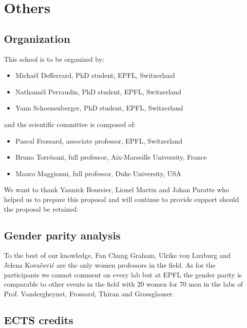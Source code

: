 \documentclass[a4paper]{scrartcl}
\begin{document}
\section{Others}

\subsection{Organization}

This school is to be organized by:
\begin{itemize}
	\setlength{\itemsep}{0pt} \setlength{\parskip}{0pt}
	\item Michaël Defferrard, PhD student, EPFL, Switzerland
	\item Nathanaël Perraudin, PhD student, EPFL, Switzerland
	\item Yann Schoenenberger, PhD student, EPFL, Switzerland
\end{itemize}
and the scientific committee is composed of:
\begin{itemize}
	\setlength{\itemsep}{0pt} \setlength{\parskip}{0pt}
	\item Pascal Frossard, associate professor, EPFL, Switzerland
	\item Bruno Torrésani, full professor, Aix-Marseille University, France
	\item Mauro Maggionni, full professor, Duke University, USA
\end{itemize}

We want to thank Yannick Boursier, Lionel Martin and Johan Paratte who helped us
to prepare this proposal and will continue to provide support should the
proposal be retained.

\subsection{Gender parity analysis}

To the best of our knowledge, Fan Chung Graham, Ulrike von Luxburg and Jelena
Kovačević are the only women professors in the field. As for the participants we
cannot comment on every lab but at EPFL the gender parity is comparable to other
events in the field with 20 women for 70 men in the labs of Prof. Vandergheynst,
Frossard, Thiran and Grossglauser.

\subsection{ECTS credits}
\end{document}
